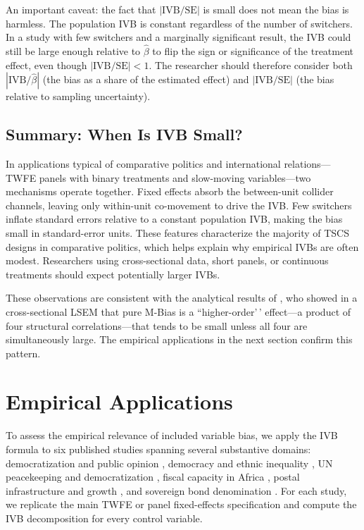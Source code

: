\documentclass[
]{article}
\begin{document}
An important caveat: the fact that \(|\text{IVB}/\text{SE}|\) is small
does not mean the bias is harmless. The population IVB is constant
regardless of the number of switchers. In a study with few switchers and
a marginally significant result, the IVB could still be large enough
relative to \(\hat\beta\) to flip the sign or significance of the
treatment effect, even though \(|\text{IVB}/\text{SE}| < 1\). The
researcher should therefore consider both \(|\text{IVB}/\hat\beta|\)
(the bias as a share of the estimated effect) and
\(|\text{IVB}/\text{SE}|\) (the bias relative to sampling uncertainty).

\subsection{Summary: When Is IVB
Small?}\label{summary-when-is-ivb-small}

In applications typical of comparative politics and international
relations---TWFE panels with binary treatments and slow-moving
variables---two mechanisms operate together. Fixed effects absorb the
between-unit collider channels, leaving only within-unit co-movement to
drive the IVB. Few switchers inflate standard errors relative to a
constant population IVB, making the bias small in standard-error units.
These features characterize the majority of TSCS designs in comparative
politics, which helps explain why empirical IVBs are often modest.
Researchers using cross-sectional data, short panels, or continuous
treatments should expect potentially larger IVBs.

These observations are consistent with the analytical results of
\citet{ding2015adjust}, who showed in a cross-sectional LSEM that pure
M-Bias is a ``higher-order'\,' effect---a product of four structural
correlations---that tends to be small unless all four are simultaneously
large. The empirical applications in the next section confirm this
pattern.

\section{\texorpdfstring{Empirical Applications
\label{sec:applications}}{Empirical Applications }}\label{empirical-applications}

To assess the empirical relevance of included variable bias, we apply
the IVB formula to six published studies spanning several substantive
domains: democratization and public opinion \citep{claassen2020},
democracy and ethnic inequality \citep{leipziger2024}, UN peacekeeping
and democratization \citep{blair_etal2022}, fiscal capacity in Africa
\citep{albers_etal2023}, postal infrastructure and growth
\citep{rogowski_etal2022}, and sovereign bond denomination
\citep{ballard_rosa_etal2021}. For each study, we replicate the main
TWFE or panel fixed-effects specification and compute the IVB
decomposition for every control variable.
\end{document}
